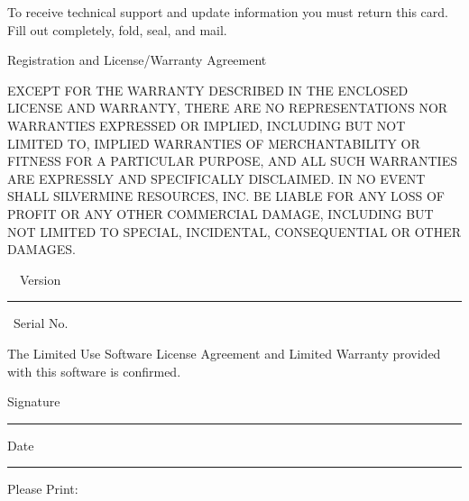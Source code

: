 \pagestyle{empty} 

\thicklines
\setlength{\unitlength}{1pt}

%
%
\oddsidemargin 0in \evensidemargin 0in \topmargin 0.75in
\columnsep 10pt \columnseprule 0pt 
\marginparwidth 90pt \marginparsep 11pt \marginparpush 5pt 
\headheight 0pt \headsep 0pt 
\footheight 0pt \footskip 0pt 
\textheight 8in \textwidth 5in
\parindent 0pt  \parskip 4pt

%
%
\newcommand{\threepica}{\rule{0.3in}{0.5pt}}
\newcommand{\oneinch}{\rule{1in}{0.5pt}}
\newcommand{\twoinch}{\rule{2in}{0.5pt}}
\newcommand{\restofline}{\hrulefill}

%
%
\newcommand{\rightcol}[1]{\makebox[2in]{#1}}


 

To receive technical support and update information you must return
this card.  Fill out completely, fold, seal, and mail.
\begin{center}
Registration and License/Warranty Agreement     
\end{center}

\sloppypar
EXCEPT FOR THE WARRANTY DESCRIBED IN THE ENCLOSED LICENSE AND
WARRANTY, THERE ARE NO REPRESENTATIONS NOR WARRANTIES EXPRESSED OR
IMPLIED, INCLUDING BUT NOT LIMITED TO, IMPLIED WARRANTIES OF
MERCHANT\-ABILITY OR FITNESS FOR A PAR\-TIC\-U\-LAR PURPOSE, AND ALL
SUCH WARRANTIES ARE EXPRESSLY AND SPECIFICALLY DISCLAIMED.  IN NO
EVENT SHALL SILVERMINE RESOURCES, INC.  BE LIABLE FOR ANY LOSS OF
PROFIT OR ANY OTHER COMMERCIAL DAMAGE, INCLUDING BUT NOT LIMITED TO
SPECIAL, INCIDENTAL, CONSEQUENTIAL OR OTHER DAMAGES.

\bigskip

\RD\ \ Version\oneinch\ Serial No.\restofline

\bigskip

The Limited Use Software License Agreement and Limited Warranty
provided with this software is confirmed.

\medskip
Signature\twoinch\hfill Date\twoinch

\begin{center}
Please Print:
\end{center}



